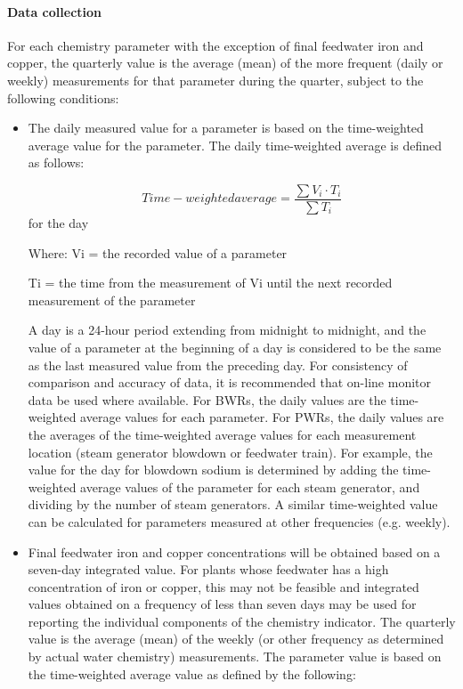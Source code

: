 \paragraph{Data collection}

For each chemistry parameter with the exception of final feedwater
iron and copper, the quarterly value is the average (mean) of the more
frequent (daily or weekly) measurements for that parameter during the
quarter, subject to the following conditions:
\begin{itemize}
\item The daily measured value for a parameter is based on the time-weighted
average value for the parameter. The daily time-weighted average is
defined as follows:

$$ Time-weighted average = \frac{\sum{V_i \cdot T_i}}{\sum{T_i}} $$ for the day

Where:	Vi =	the recorded value of a parameter

Ti  = 	the time from the measurement of Vi until the next recorded
measurement of the parameter

A day is a 24-hour period extending from midnight to midnight, and the
value of a parameter at the beginning of a day is considered to be the
same as the last measured value from the preceding day. For
consistency of comparison and accuracy of data, it is recommended that
on-line monitor data be used where available. For BWRs, the daily
values are the time-weighted average values for each parameter. For
PWRs, the daily values are the averages of the time-weighted average
values for each measurement location (steam generator blowdown or
feedwater train). For example, the value for the day for blowdown
sodium is determined by adding the time-weighted average values of the
parameter for each steam generator, and dividing by the number of
steam generators. A similar time-weighted value can be calculated for
parameters measured at other frequencies (e.g. weekly).

\item Final feedwater iron and copper concentrations will be obtained
  based on a seven-day integrated value. For plants whose feedwater
  has a high concentration of iron or copper, this may not be feasible
  and integrated values obtained on a frequency of less than seven
  days may be used for reporting the individual components of the
  chemistry indicator. The quarterly value is the average (mean) of
  the weekly (or other frequency as determined by actual water
  chemistry) measurements. The parameter value is based on the
  time-weighted average value as defined by the following:


\end{itemize}

